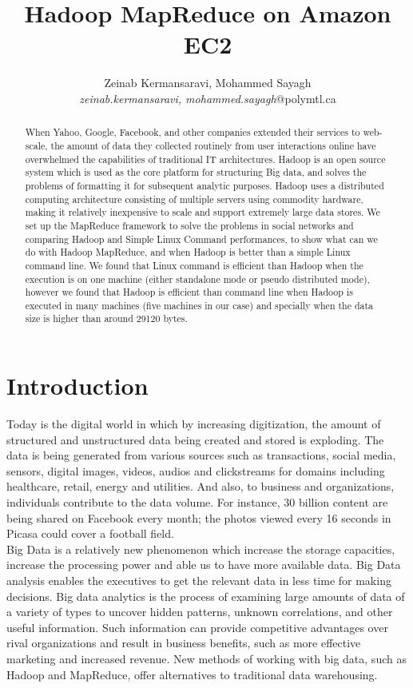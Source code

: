 \documentclass[10pt, conference]{IEEEtran}
\title{Hadoop MapReduce on Amazon EC2}
\author{Zeinab Kermansaravi, Mohammed Sayagh
    \\
    \emph{zeinab.kermansaravi, mohammed.sayagh}@polymtl.ca}
\begin{document}
\maketitle

\begin{abstract}
When Yahoo, Google, Facebook, and other companies extended their services to web-scale, the amount of data they collected routinely from user interactions online have overwhelmed the capabilities of traditional IT architectures. Hadoop is an open source system which is used as the core platform for structuring Big data, and solves the problems of formatting it for subsequent analytic purposes. Hadoop uses a distributed computing architecture consisting of multiple servers using commodity hardware, making it relatively inexpensive to scale and support extremely large data stores. We set up the MapReduce framework to solve the problems in social networks and comparing Hadoop and Simple Linux Command performances, to show what can we do with Hadoop MapReduce, and when Hadoop is better than a simple Linux command line. We found that Linux command is efficient than Hadoop when the execution is on one machine (either standalone mode or pseudo distributed mode), however we found that Hadoop is efficient than command line when Hadoop is executed in many machines (five machines in our case) and specially when the data size is higher than around 29120 bytes.

\end{abstract}

\section{Introduction}
\label{sec:introduction}

\indent Today is the digital world in which by increasing digitization, the amount of structured and unstructured data being created and stored is exploding. The data is being generated from various sources such as transactions, social media, sensors, digital images, videos, audios and clickstreams for domains including healthcare, retail, energy and utilities. And also, to business and organizations, individuals contribute to the data volume. For instance, 30 billion content are being shared on Facebook every month; the photos viewed every 16 seconds in Picasa could cover a football field. \\
\indent Big Data is a relatively new phenomenon which increase the storage capacities, increase the processing power and able us to have more available data. Big Data analysis enables the executives to get the relevant data in less time for making decisions. Big data analytics is the process of examining large amounts of data of a variety of types to uncover hidden patterns, unknown correlations, and other useful information. Such information can provide competitive advantages over rival organizations and result in business benefits, such as more effective marketing and increased revenue. New methods of working with big data, such as Hadoop and MapReduce, offer alternatives to traditional data warehousing. 
\end{document}
